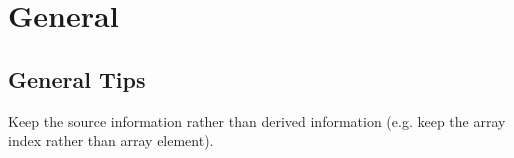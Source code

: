 \chapter{General}
\section{General Tips}
 Keep the source information rather than derived information (e.g. keep the array index rather than array element).
